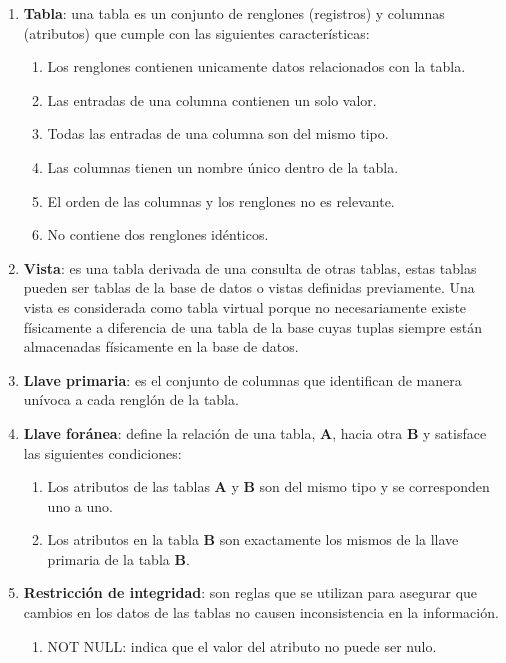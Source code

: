 \begin{enumerate}
	\item \textbf{Tabla}: una tabla es un conjunto de renglones (registros) y columnas (atributos) que cumple con las siguientes características\cite{DataBaseConcepts}:
	\begin{enumerate}
		\item Los renglones contienen unicamente datos relacionados con la tabla.
		\item Las entradas de una columna contienen un solo valor.
		\item Todas las entradas de una columna son del mismo tipo.
		\item Las columnas tienen un nombre único dentro de la tabla.
		\item El orden de las columnas y los renglones no es relevante.
		\item No contiene dos renglones idénticos.
	\end{enumerate}
	\item \textbf{Vista}: es una tabla derivada de una consulta de otras tablas, estas tablas pueden ser tablas de la base de datos o vistas definidas previamente. Una vista es considerada como tabla virtual porque no necesariamente existe físicamente a diferencia de una tabla de la base cuyas tuplas siempre están almacenadas físicamente en la base de datos\cite{FundamentalsOfDBSystems}.
	\item \textbf{Llave primaria}: es el conjunto de columnas que identifican de manera unívoca a cada renglón de la tabla.\cite{DataBaseConcepts}
	\item \textbf{Llave foránea}: define la relación de una tabla, \textbf{A}, hacia otra \textbf{B} y satisface las siguientes condiciones\cite{FundamentalsOfDBSystems, DataBaseConcepts}:
	\begin{enumerate}
		\item Los atributos de las tablas \textbf{A} y \textbf{B} son del mismo tipo y se corresponden uno a uno.
		\item Los atributos en la tabla \textbf{B} son exactamente los mismos de la llave primaria de la tabla \textbf{B}.
	\end{enumerate}
	\item \textbf{Restricción de integridad}: son reglas que se utilizan para asegurar que cambios en los datos de las tablas no causen inconsistencia en la información\cite{DatabaseSystemConcepts}.
	\begin{enumerate}
		\item NOT NULL: indica que el valor del atributo no puede ser nulo\cite{FundamentosSistemasBasesDatos}.

\end{enumerate}
\end{enumerate}
